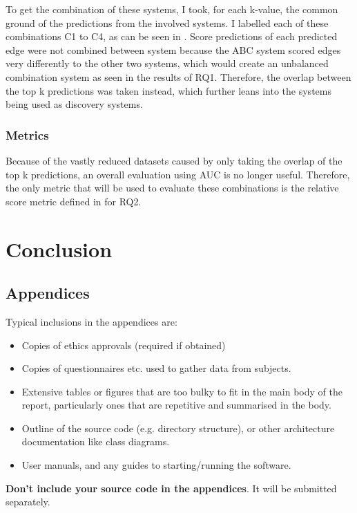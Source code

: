 \documentclass{l4proj}
\begin{document}
To get the combination of these systems, I took, for each k-value, the common ground of the predictions from the involved systems. I labelled each of these combinations C1 to C4, as can be seen in . Score predictions of each predicted edge were not combined between system because the ABC system scored edges very differently to the other two systems, which would create an unbalanced combination system as seen in the results of RQ1. Therefore, the overlap between the top k predictions was taken instead, which further leans into the systems being used as discovery systems. \\

\subsection{Metrics}

Because of the vastly reduced datasets caused by only taking the overlap of the top k predictions, an overall evaluation using AUC is no longer useful. Therefore, the only metric that will be used to evaluate these combinations is the relative score metric defined in for RQ2. 

\chapter{Conclusion}    

\begin{appendices}

\chapter{Appendices}

Typical inclusions in the appendices are:

\begin{itemize}
\item
  Copies of ethics approvals (required if obtained)
\item
  Copies of questionnaires etc. used to gather data from subjects.
\item
  Extensive tables or figures that are too bulky to fit in the main body of
  the report, particularly ones that are repetitive and summarised in the body.

\item Outline of the source code (e.g. directory structure), or other architecture documentation like class diagrams.

\item User manuals, and any guides to starting/running the software.

\end{itemize}

\textbf{Don't include your source code in the appendices}. It will be
submitted separately.

\end{appendices}
\end{document}
